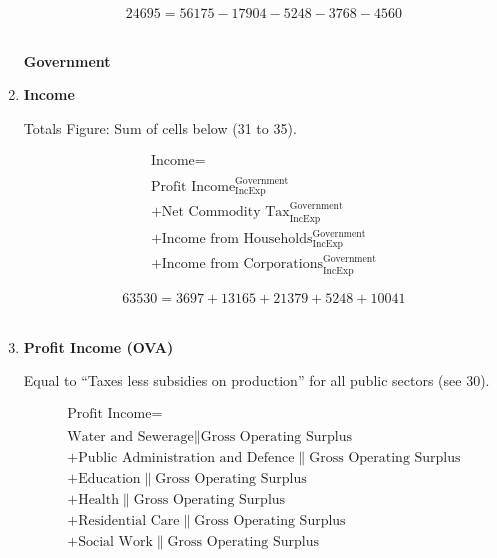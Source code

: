 \begin{enumerate}
\begin{equation} \nonumber
24695 = 56175-17904-5248-3768-4560
\end{equation}\\


\pagebreak

\begin{center}
\textbf{\LARGE Government}
\end{center}

\item \textbf {Income}

Totals Figure: Sum of cells below (31 to 35).

\begin{equation}
\begin{split}
\text{Income} =  \\ \\
\text{Profit Income}^\text{Government}_\text{IncExp}\\
+\text{Net Commodity Tax}^\text{Government}_\text{IncExp}\\
+\text{Income from Households}^\text{Government}_\text{IncExp}\\
+\text{Income from Corporations}^\text{Government}_\text{IncExp}
\end{split} \label{eq:2.5.34}
\end{equation}

\begin{equation} \nonumber
63530 = 3697+13165+21379+5248+10041
\end{equation}\\


\item \textbf {Profit Income (OVA)}

Equal to ``Taxes less subsidies on production'' for all public sectors (see 30).  \cite{ScotGov2013a}

\begin{equation}
\begin{split}
\text{Profit Income} =  \\ \\
\text{Water and Sewerage}\|\text{Gross Operating Surplus}\\
+\text{Public Administration and Defence}\|\text{Gross Operating Surplus}\\
+\text{Education}\|\text{Gross Operating Surplus}\\
+\text{Health}\|\text{Gross Operating Surplus}\\
+\text{Residential Care}\|\text{Gross Operating Surplus}\\
+\text{Social Work}\|\text{Gross Operating Surplus}
\end{split} \label{eq:2.5.35}
\end{equation}


\end{enumerate}
